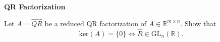 \textbf{QR Factorization}

Let $A=\widehat{Q}\widehat{R}$ be a reduced QR factorization of $A\in\mathbb{R}^{m \times n}$. Show that 
$$\text{ker}(A) = \{0\} \Leftrightarrow \widehat{R}\in \text{GL}_n(\mathbb{R}). $$